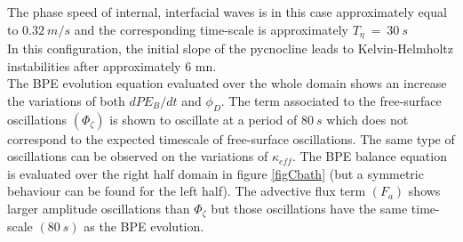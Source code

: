The phase speed of internal, interfacial waves is in this case approximately equal to $0.32\ m/s$ and the corresponding time-scale is approximately $T_{\eta}\ =\ 30\ s$\\
In this configuration, the initial slope of the pycnocline leads to Kelvin-Helmholtz instabilities after approximately 6 mn.\\
The BPE evolution equation evaluated over the whole domain shows an increase the variations of both $dPE_B/dt$ and $\phi_D$. The term associated to the free-surface oscillations $(\Phi_{\zeta})$ is shown to oscillate at a period of $80\ s$ which does not correspond to the expected timescale of free-surface oscillations. The same type of oscillations can be observed on the variations of $\kappa_{eff}$. 
The BPE balance equation is evaluated over the right half domain in figure \ref{figCbath} (but a symmetric behaviour can be found for the left half). The advective flux term $(F_a)$ shows larger amplitude oscillations than $\Phi_{\zeta}$ but those oscillations have the same time-scale $(80\ s)$ as the BPE evolution.

